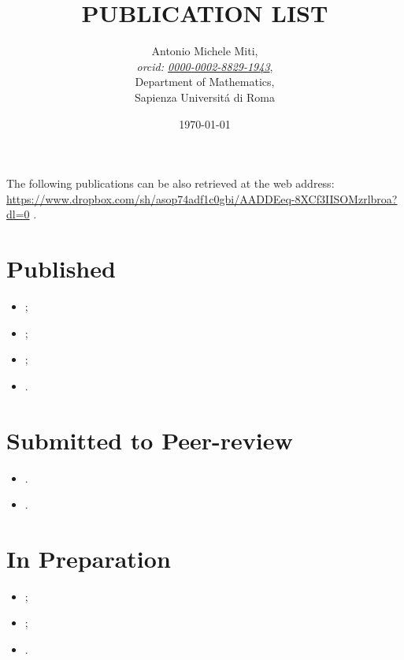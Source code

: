 \documentclass{article}
\title{PUBLICATION LIST}
\date{\today}
\author{
	Antonio Michele Miti,\\
	\emph{orcid: \href{https://orcid.org/0000-0002-8829-1943}{0000-0002-8829-1943}},
	\\
	Department of Mathematics,\\
	Sapienza Universit\'a di Roma
}
\begin{document}
  

	\maketitle

	\noindent
  The following publications can be also retrieved at the web address:
  \\ 
  \url{https://www.dropbox.com/sh/asop74adf1c0gbi/AADDEeq-8XCf3IISOMzrlbroa?dl=0}
  .


  \section*{Published}
	  \begin{itemize}
 	   \item {};
 	   \item {};
 	   \item {};
 	   \item {}.
	  \end{itemize}



  \section*{Submitted to Peer-review}
	  \begin{itemize}
    	   \item {}.
 	   \item {}.
	  \end{itemize}

%  
  \section*{In Preparation}
	  \begin{itemize}
    	   \item {};
    	   \item {};
 	   \item {}.
	  \end{itemize}

  
\end{document}

